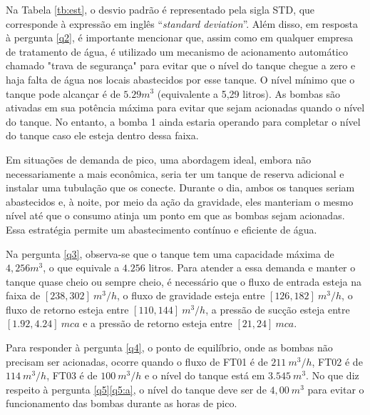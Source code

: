 Na Tabela \ref{tb:est}, o desvio padrão é representado pela sigla STD, que corresponde à expressão em inglês ``\textit{standard deviation}''. Além disso, em resposta à pergunta \ref{q2}, é importante mencionar que, assim como em qualquer empresa de tratamento de água, é utilizado um mecanismo de acionamento automático chamado "trava de segurança" para evitar que o nível do tanque chegue a zero e haja falta de água nos locais abastecidos por esse tanque. O nível mínimo que o tanque pode alcançar é de $5.29 m^3$ (equivalente a 5,29 litros). As bombas são ativadas em sua potência máxima para evitar que sejam acionadas quando o nível do tanque. No entanto, a bomba 1 ainda estaria operando para completar o nível do tanque caso ele esteja dentro dessa faixa.

Em situações de demanda de pico, uma abordagem ideal, embora não necessariamente a mais econômica, seria ter um tanque de reserva adicional e instalar uma tubulação que os conecte. Durante o dia, ambos os tanques seriam abastecidos e, à noite, por meio da ação da gravidade, eles manteriam o mesmo nível até que o consumo atinja um ponto em que as bombas sejam acionadas. Essa estratégia permite um abastecimento contínuo e eficiente de água.


Na pergunta \ref{q3}, observa-se que o tanque tem uma capacidade máxima de $4,256 m^3$, o que equivale a $4.256$ litros. Para atender a essa demanda e manter o tanque quase cheio ou sempre cheio, é necessário que o fluxo de entrada esteja na faixa de $[238, 302] \ m^3/h$, o fluxo de gravidade esteja entre $[126, 182] \ m^3/h$, o fluxo de retorno esteja entre $[110, 144] \ m^3/h$, a pressão de sucção esteja entre $[1.92, 4.24] \ mca$ e a pressão de retorno esteja entre $[21, 24] \ mca$.

Para responder à pergunta \ref{q4}, o ponto de equilíbrio, onde as bombas não precisam ser acionadas, ocorre quando o fluxo de FT01 é de $211 \ m^3/h$, FT02 é de $114 \ m^3/h$, FT03 é de $100 \ m^3/h$ e o nível do tanque está em $3.545 \ m^3$.
No que diz respeito à pergunta \ref{q5}\ref{q5:a}, o nível do tanque deve ser de $4,00 \ m^3$ para evitar o funcionamento das bombas durante as horas de pico.
